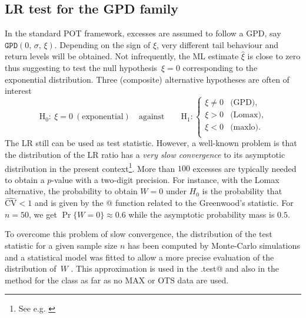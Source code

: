 \documentclass[a4paper]{report}
\begin{document}
\subsection{LR test for the GPD family}
In the standard POT framework, excesses are assumed to follow a GPD, say
$\texttt{GPD}(0,\,\sigma,\,\xi)$. Depending on the sign of $\xi$, very
different tail behaviour and return levels will be obtained.  Not
infrequently, the ML estimate $\widehat{\xi}$ is close to zero 
thus suggesting to test the null hypothesis~$\xi = 0$ corresponding to
the exponential distribution.  Three (composite) alternative
hypotheses are often of interest
$$
   \textrm{H}_0: \: \xi = 0 \: (\textrm{exponential}) \quad 
   \textrm{against} \qquad  \textrm{H}_1:
   \begin{cases} 
     \xi \neq 0 & \textrm{(GPD)},\\
     \xi > 0    & \textrm{(Lomax)},\\
     \xi < 0    & \textrm{(maxlo)}.\\
   \end{cases}
$$  
The LR still can be used as test statistic. However, a well-known
problem is that the distribution of the LR ratio has a \textit{very
  slow convergence} to its asymptotic distribution in the present
context\footnote{See e.g. \cite{Kozubowski}}.  More than $100$ excesses
are typically needed to obtain a $p$-value with a two-digit
precision. For instance, with the Lomax alternative, the probability
to obtain $W=0$ under $H_0$ is the probability that
$\widehat{\mathrm{CV}}<1$ and is given by the @
function related to the Greenwood's statistic. For $n=50$, we get
$\Pr\{W = 0\} \approx 0.6$
while the asymptotic probability mass is $0.5$.  

To overcome this problem of slow convergence, the distribution of the
test statistic for a given sample size $n$ has been computed by
Monte-Carlo simulations and a statistical model was fitted to allow a
more precise evaluation of the distribution of~$W$
\citep{RenCompDet}. This approximation is used in the
\verb@LRexp.test@ and also in the \verb@anova@ method for the
\verb@Renouv@ class as far as no MAX or OTS data are used.
\end{document}
